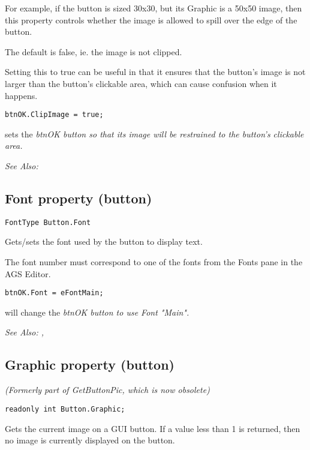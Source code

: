 For example, if the button is sized 30x30, but its Graphic is a 50x50 image, then
this property controls whether the image is allowed to spill over the edge of the button.

The default is false, ie. the image is not clipped.

Setting this to true can be useful in that it ensures that the button's image is not larger
than the button's clickable area, which can cause confusion when it happens.

\begin{verbatim}
btnOK.ClipImage = true;
\end{verbatim}
sets the \it{btnOK} button so that its image will be restrained to the button's clickable area.

\it{See Also:} 


\subsection{Font property (button)}\label{Button.Font}%

\begin{verbatim}
FontType Button.Font
\end{verbatim}
Gets/sets the font used by the button to display text.

The font number must correspond to one of the fonts from the Fonts pane in the AGS Editor.

\begin{verbatim}
btnOK.Font = eFontMain;
\end{verbatim}
will change the \it{btnOK} button to use Font "Main".

\it{See Also:} , 


\subsection{Graphic property (button)}\label{Button.Graphic}%

\it{(Formerly part of GetButtonPic, which is now obsolete)}

\begin{verbatim}
readonly int Button.Graphic;
\end{verbatim}
Gets the current image on a GUI button. If a value less than 1 is returned,
then no image is currently displayed on the button.

